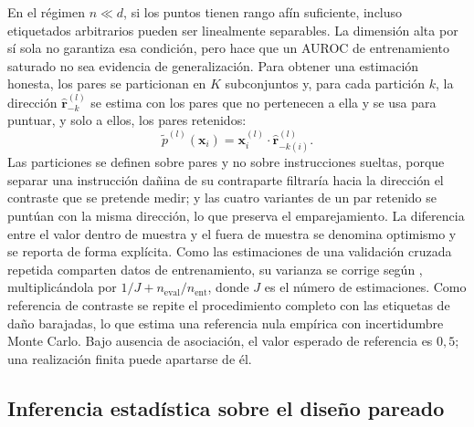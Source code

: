 En el régimen $n \ll d$, si los puntos tienen rango afín suficiente, incluso etiquetados arbitrarios pueden ser linealmente separables. La dimensión alta por sí sola no garantiza esa condición, pero hace que un AUROC de entrenamiento saturado no sea evidencia de generalización. Para obtener una estimación honesta, los pares se particionan en $K$ subconjuntos y, para cada partición $k$, la dirección $\hat{\bm{r}}^{(l)}_{-k}$ se estima con los pares que no pertenecen a ella y se usa para puntuar, y solo a ellos, los pares retenidos:
\begin{equation}
\tilde{p}^{(l)}(\bm{x}_i) = \bm{x}_i^{(l)} \cdot \hat{\bm{r}}^{(l)}_{-k(i)}.
\end{equation}
Las particiones se definen sobre pares y no sobre instrucciones sueltas, porque separar una instrucción dañina de su contraparte filtraría hacia la dirección el contraste que se pretende medir; y las cuatro variantes de un par retenido se puntúan con la misma dirección, lo que preserva el emparejamiento. La diferencia entre el valor dentro de muestra y el fuera de muestra se denomina optimismo y se reporta de forma explícita. Como las estimaciones de una validación cruzada repetida comparten datos de entrenamiento, su varianza se corrige según \textcite{nadeau2003}, multiplicándola por $1/J + n_{\text{eval}}/n_{\text{ent}}$, donde $J$ es el número de estimaciones. Como referencia de contraste se repite el procedimiento completo con las etiquetas de daño barajadas, lo que estima una referencia nula empírica con incertidumbre Monte Carlo. Bajo ausencia de asociación, el valor esperado de referencia es $0{,}5$; una realización finita puede apartarse de él.

\subsection{Inferencia estadística sobre el diseño pareado}

